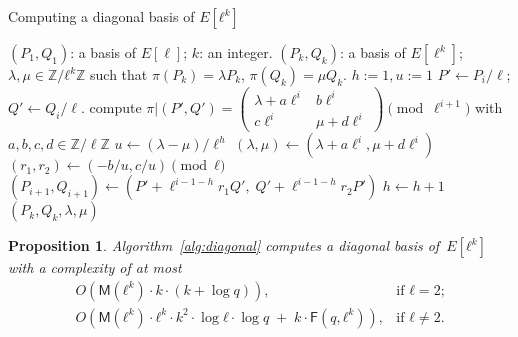 \documentclass{lms}
\newtheorem{prop}[thm]{Proposition}
\def\pa#1{\left(#1\right)}
\def\cout#1{\mathsf{#1}}
\begin{document}
\begin{algorithm}
\caption{\label{alg:diagonal}Computing a diagonal basis of $E[ℓ^k]$}
\begin{algorithmic}[1]
\REQUIRE $(P_1, Q_1 )$: a basis of $E[\ell]$;
$k$: an integer.
\ENSURE $(P_k, Q_k )$: a basis of $E[\ell^k]$;
$λ, μ ∈ ℤ/ℓ^k ℤ$
such that $\pi(P_k)= λ P_k$, $ \pi(Q_k)= μ Q_k$.
\STATE $h:=1, u:=1$
\STATE $P' \leftarrow P_i/\ell$; $Q' \leftarrow Q_i/\ell$.
\STATE compute $\pi|(P',Q')=\left( \begin{array}{cc}
λ + a\ell^{i} & b\ell^{i}\\
c\ell^{i} & μ + d\ell^{i}
\end{array} \right) \pmod {\ell^{i+1}}$
with $a,b,c,d \in \mathbb{Z}/\ell\mathbb{Z}$
\STATE $u \leftarrow (λ -μ)/\ell^h$
\ENDIF
\STATE $(λ, μ) \gets
  (λ + a\ell^i, μ + d\ell^i)$
\STATE $(r_1,r_2) \gets (-b/u , c/u) \pmod{ℓ}$
\STATE $(P_{i+1},Q_{i+1}) \gets
  (P'+\ell^{i-1-h}r_1 Q',\;Q'+\ell^{i-1-h}r_2 P')$
\STATE $h \leftarrow h+1$
\ENDIF
\ENDFOR
\RETURN $(P_{k},Q_{k},λ,μ)$
\end{algorithmic}
\end{algorithm}
\begin{prop}
Algorithm~\ref{alg:diagonal} computes a diagonal basis of~$E[ℓ^k]$
with a complexity of at most
\begin{equation*}
\begin{array}{ll}
O\pa{\cout{M}(ℓ^k) · k · (k + \log q)}, &\text{if $ℓ = 2$;}\\
O\pa{\cout{M}(ℓ^k) · ℓ^k · k^2 · \log ℓ · \log q
  \;+\; k · \cout{F}(q, ℓ^k)}, &\text{if $ℓ ≠ 2$.}
\end{array}
\end{equation*}
\end{prop}
\end{document}
